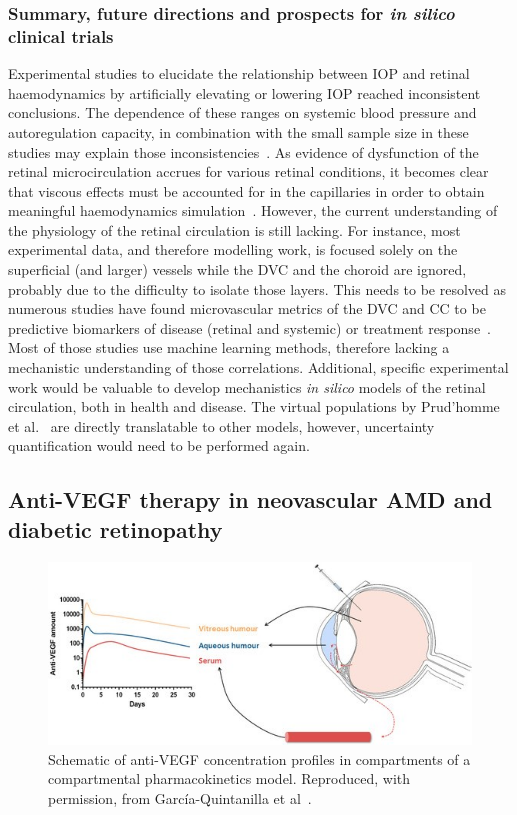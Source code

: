 \documentclass{article}
\begin{document}
\subsubsection{Summary, future directions and prospects for \textit{in silico} clinical trials}
Experimental studies to elucidate the relationship between IOP and retinal haemodynamics by artificially elevating or lowering IOP reached inconsistent conclusions\cite{Conway_2010,Findl_1997}.
The dependence of these ranges on systemic blood pressure and autoregulation capacity, in combination with the small sample size in these studies may explain those inconsistencies~\cite{Guidoboni_2014a}.
As evidence of dysfunction of the retinal microcirculation accrues for various retinal conditions, it becomes clear that viscous effects must be accounted for in the capillaries in order to obtain meaningful haemodynamics simulation~\cite{Ganesan_2010}.
However, the current understanding of the physiology of the retinal circulation is still lacking.
For instance, most experimental data, and therefore modelling work, is focused solely on the superficial (and larger) vessels while the DVC and the choroid are ignored, probably due to the difficulty to isolate those layers.
This needs to be resolved as numerous studies have found microvascular metrics of the DVC and CC to be predictive biomarkers of disease (retinal and systemic) or treatment response~\cite{Kashani_2017}.
Most of those studies use machine learning methods, therefore lacking a mechanistic understanding of those correlations.
Additional, specific experimental work would be valuable to develop mechanistics \textit{in silico} models of the retinal circulation, both in health and disease.
The virtual populations by Prud'homme et al.~\cite{Prudhomme_2021} are directly translatable to other models, however, uncertainty quantification would need to be performed again.


\subsection{Anti-VEGF therapy in neovascular AMD and diabetic retinopathy}\label{sec:Anti-VEGF}

\begin{figure}[t!]
  \centering
  \includegraphics{AntiVEGF}
  \caption{Schematic of anti-VEGF concentration profiles in compartments of a compartmental pharmacokinetics model. Reproduced, with permission, from Garc\'ia-Quintanilla et al~\cite{GarciaQuintanilla_2019}.}
  \label{fig:AntiVEGF}
\end{figure}
\end{document}
